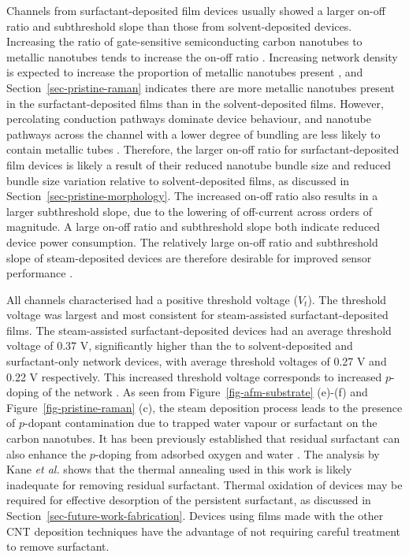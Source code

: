 \documentclass[
  a4paper,
]{scrbook}
\begin{document}
Channels from surfactant-deposited film devices usually showed a larger
on-off ratio and subthreshold slope than those from solvent-deposited
devices. Increasing the ratio of gate-sensitive semiconducting carbon
nanotubes to metallic nanotubes tends to increase the on-off ratio
\autocite{LeMieux2008,Rouhi2011,Zaumseil2015,Murugathas2018}. Increasing
network density is expected to increase the proportion of metallic
nanotubes present \autocite{Rouhi2011}, and
Section~\ref{sec-pristine-raman} indicates there are more metallic
nanotubes present in the surfactant-deposited films than in the
solvent-deposited films. However, percolating conduction pathways
dominate device behaviour, and nanotube pathways across the channel with
a lower degree of bundling are less likely to contain metallic tubes
\autocite{Murugathas2018}. Therefore, the larger on-off ratio for
surfactant-deposited film devices is likely a result of their reduced
nanotube bundle size and reduced bundle size variation relative to
solvent-deposited films, as discussed in
Section~\ref{sec-pristine-morphology}. The increased on-off ratio also
results in a larger subthreshold slope, due to the lowering of
off-current across orders of magnitude. A large on-off ratio and
subthreshold slope both indicate reduced device power consumption. The
relatively large on-off ratio and subthreshold slope of steam-deposited
devices are therefore desirable for improved sensor performance
\autocite{Kauffman2008,Heller2009,Gao2010}.

All channels characterised had a positive threshold voltage (\(V_{t}\)).
The threshold voltage was largest and most consistent for steam-assisted
surfactant-deposited films. The steam-assisted surfactant-deposited
devices had an average threshold voltage of 0.37 V, significantly higher
than the to solvent-deposited and surfactant-only network devices, with
average threshold voltages of 0.27 V and 0.22 V respectively. This
increased threshold voltage corresponds to increased \(p\)-doping of the
network \autocite{Kang2005,Heller2008,Murugathas2018}. As seen from
Figure~\ref{fig-afm-substrate} (e)-(f) and
Figure~\ref{fig-pristine-raman} (c), the steam deposition process leads
to the presence of \(p\)-dopant contamination due to trapped water
vapour or surfactant on the carbon nanotubes. It has been previously
established that residual surfactant can also enhance the \(p\)-doping
from adsorbed oxygen and water
\autocite{Kane2014,Nonoguchi2018,Christensen2022}. The analysis by Kane
\emph{et al.} shows that the thermal annealing used in this work is
likely inadequate for removing residual surfactant. Thermal oxidation of
devices may be required for effective desorption of the persistent
surfactant, as discussed in Section~\ref{sec-future-work-fabrication}.
Devices using films made with the other CNT deposition techniques have
the advantage of not requiring careful treatment to remove surfactant.
\end{document}
